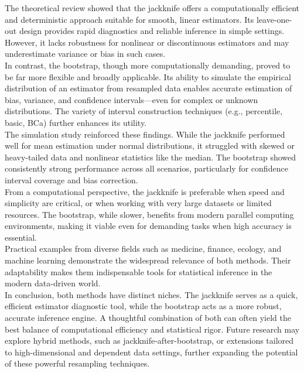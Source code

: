 \documentclass{article}
\begin{document}
The theoretical review showed that the jackknife offers a computationally efficient and deterministic approach suitable for smooth, linear estimators. Its leave-one-out design provides rapid diagnostics and reliable inference in simple settings. However, it lacks robustness for nonlinear or discontinuous estimators and may underestimate variance or bias in such cases. \\

In contrast, the bootstrap, though more computationally demanding, proved to be far more flexible and broadly applicable. Its ability to simulate the empirical distribution of an estimator from resampled data enables accurate estimation of bias, variance, and confidence intervals—even for complex or unknown distributions. The variety of interval construction techniques (e.g., percentile, basic, BCa) further enhances its utility. \\

The simulation study reinforced these findings. While the jackknife performed well for mean estimation under normal distributions, it struggled with skewed or heavy-tailed data and nonlinear statistics like the median. The bootstrap showed consistently strong performance across all scenarios, particularly for confidence interval coverage and bias correction.\\

From a computational perspective, the jackknife is preferable when speed and simplicity are critical, or when working with very large datasets or limited resources. The bootstrap, while slower, benefits from modern parallel computing environments, making it viable even for demanding tasks when high accuracy is essential.\\

Practical examples from diverse fields such as medicine, finance, ecology, and machine learning demonstrate the widespread relevance of both methods. Their adaptability makes them indispensable tools for statistical inference in the modern data-driven world.\\

In conclusion, both methods have distinct niches. The jackknife serves as a quick, efficient estimator diagnostic tool, while the bootstrap acts as a more robust, accurate inference engine. A thoughtful combination of both can often yield the best balance of computational efficiency and statistical rigor. Future research may explore hybrid methods, such as jackknife-after-bootstrap, or extensions tailored to high-dimensional and dependent data settings, further expanding the potential of these powerful resampling techniques.\\
\end{document}
